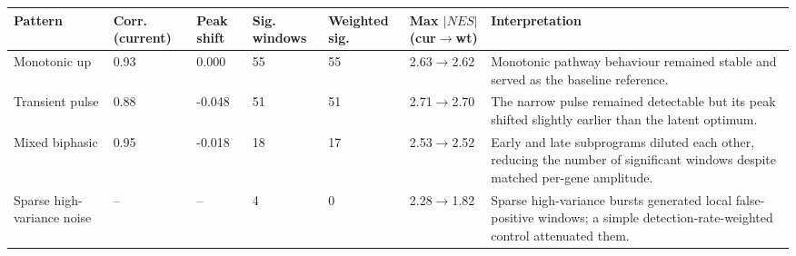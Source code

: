 \begin{tabular}{p{}p{}p{}p{}p{}p{}p{}}
\toprule
Pattern & Corr. (current) & Peak shift & Sig. windows & Weighted sig. & Max $|NES|$ (cur$\rightarrow$wt) & Interpretation \\
\midrule
Monotonic up & 0.93 & 0.000 & 55 & 55 & 2.63$\rightarrow$2.62 & Monotonic pathway behaviour remained stable and served as the baseline reference. \\
Transient pulse & 0.88 & -0.048 & 51 & 51 & 2.71$\rightarrow$2.70 & The narrow pulse remained detectable but its peak shifted slightly earlier than the latent optimum. \\
Mixed biphasic & 0.95 & -0.018 & 18 & 17 & 2.53$\rightarrow$2.52 & Early and late subprograms diluted each other, reducing the number of significant windows despite matched per-gene amplitude. \\
Sparse high-variance noise & -- & -- & 4 & 0 & 2.28$\rightarrow$1.82 & Sparse high-variance bursts generated local false-positive windows; a simple detection-rate-weighted control attenuated them. \\
\bottomrule
\end{tabular}
